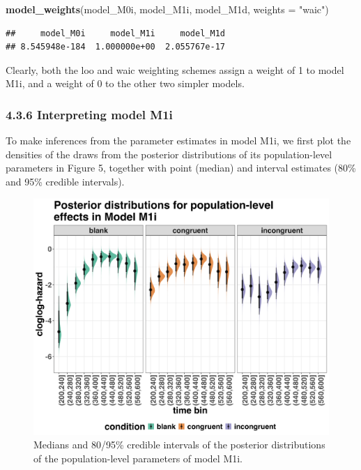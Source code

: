 \documentclass[
  man, donotrepeattitle,floatsintext]{apa6}
\newenvironment{Shaded}{\begin{snugshade}}{\end{snugshade}}
\newcommand{\AttributeTok}[1]{\textcolor[rgb]{0.13,0.29,0.53}{#1}}
\newcommand{\FunctionTok}[1]{\textcolor[rgb]{0.13,0.29,0.53}{\textbf{#1}}}
\newcommand{\NormalTok}[1]{#1}
\newcommand{\StringTok}[1]{\textcolor[rgb]{0.31,0.60,0.02}{#1}}
\begin{document}
\begin{Shaded}
\begin{Highlighting}[]
\FunctionTok{model\_weights}\NormalTok{(model\_M0i, model\_M1i, model\_M1d, }\AttributeTok{weights =} \StringTok{"waic"}\NormalTok{) }
\end{Highlighting}
\end{Shaded}

\begin{verbatim}
##     model_M0i     model_M1i     model_M1d 
## 8.545948e-184  1.000000e+00  2.055767e-17
\end{verbatim}

Clearly, both the loo and waic weighting schemes assign a weight of 1 to model M1i, and a weight of 0 to the other two simpler models.

\subsubsection{4.3.6 Interpreting model M1i}\label{interpreting-model-m1i}

To make inferences from the parameter estimates in model M1i, we first plot the densities of the draws from the posterior distributions of its population-level parameters in Figure 5, together with point (median) and interval estimates (80\% and 95\% credible intervals).



\begin{figure}[H]

{\centering \includegraphics[width=0.8\linewidth,height=0.67\textheight,]{../Tutorial_2_Bayesian/figures/M1i_postdistr} 

}

\caption{Medians and 80/95\% credible intervals of the posterior distributions of the population-level parameters of model M1i.}\label{fig:plot-fixed-effects}
\end{figure}
\end{document}
